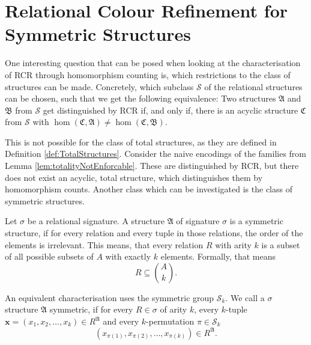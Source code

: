 \section {Relational Colour Refinement for Symmetric Structures}
\label{sec:RelationalColourRefinementForSymmetricStructures}

One interesting question that can be posed when looking at the characterisation of RCR through homomorphism counting is, which restrictions to the class of structures can be made.
Concretely, which subclass $\mathcal S$ of the relational structures can be chosen, such that we get the following equivalence:
Two structures $\mathfrak A$ and $\mathfrak B$ from $\mathcal S$ get distinguished by RCR if, and only if, there is an acyclic structure $\mathfrak C$ from $\mathcal S$ with $\hom(\mathfrak C, \mathfrak A)\neq \hom(\mathfrak C, \mathfrak B)$.

This is not possible for the class of total structures, as they are defined in Definition \ref{def:TotalStructures}.
Consider the naive encodings of the families from Lemma \ref{lem:totalityNotEnforcable}.
These are distinguished by RCR, but there does not exist an acyclic, total structure, which distinguishes them by homomorphism counts.
Another class which can be investigated is the class of symmetric structures.

\begin{definition}
	Let $\sigma$ be a relational signature.
	A structure $\mathfrak A$ of signature $\sigma$ is a symmetric structure, if for every relation and every tuple in those relations, the order of the elements is irrelevant.
	This means, that every relation $R$ with arity $k$ is a subset of all possible subsets of $A$ with exactly $k$ elements.
	Formally, that means
	$$R\subseteq \binom{A}{k}.$$
\end{definition}
An equivalent characterisation uses the symmetric group $\mathcal S_k$.
We call a $\sigma$ structure $\mathfrak A$ symmetric, if for every $R\in \sigma$ of arity $k$, every $k$-tuple $\mathbf x=(x_1,x_2,\dots,x_k)\in R^{\mathfrak A}$ and every $k$-permutation $\pi\in \mathcal S_k$
$$(x_{\pi(1)},x_{\pi(2)},\dots,x_{\pi(k)})\in R^{\mathfrak A}.$$

